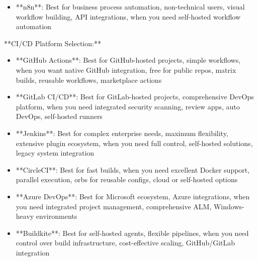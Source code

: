 \documentclass[11pt,a4paper]{article}
\begin{document}
\begin{itemize}
\item **n8n**: Best for business process automation, non-technical users, visual workflow building, API integrations, when you need self-hosted workflow automation
\end{itemize}

**CI/CD Platform Selection:**

\begin{itemize}
\item **GitHub Actions**: Best for GitHub-hosted projects, simple workflows, when you want native GitHub integration, free for public repos, matrix builds, reusable workflows, marketplace actions
\end{itemize}

\begin{itemize}
\item **GitLab CI/CD**: Best for GitLab-hosted projects, comprehensive DevOps platform, when you need integrated security scanning, review apps, auto DevOps, self-hosted runners
\end{itemize}

\begin{itemize}
\item **Jenkins**: Best for complex enterprise needs, maximum flexibility, extensive plugin ecosystem, when you need full control, self-hosted solutions, legacy system integration
\end{itemize}

\begin{itemize}
\item **CircleCI**: Best for fast builds, when you need excellent Docker support, parallel execution, orbs for reusable configs, cloud or self-hosted options
\end{itemize}

\begin{itemize}
\item **Azure DevOps**: Best for Microsoft ecosystem, Azure integrations, when you need integrated project management, comprehensive ALM, Windows-heavy environments
\end{itemize}

\begin{itemize}
\item **Buildkite**: Best for self-hosted agents, flexible pipelines, when you need control over build infrastructure, cost-effective scaling, GitHub/GitLab integration
\end{itemize}
\end{document}
